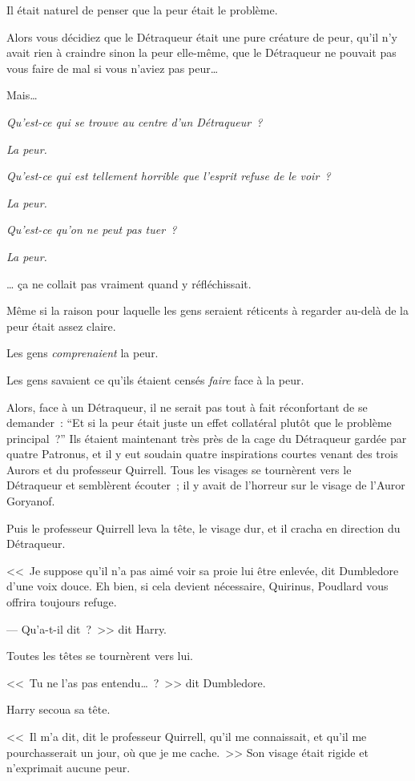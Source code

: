 Il était naturel de penser que la peur était le problème.

Alors vous décidiez que le Détraqueur était une pure créature de peur, qu'il n'y avait rien à craindre sinon la peur elle-même, que le Détraqueur ne pouvait pas vous faire de mal si vous n'aviez pas peur…

Mais…

\emph{Qu'est-ce qui se trouve au centre d'un Détraqueur~?}

\emph{La peur.}

\emph{Qu'est-ce qui est tellement horrible que l'esprit refuse de le voir~?}

\emph{La peur.}

\emph{Qu'est-ce qu'on ne peut pas tuer~?}

\emph{La peur.}

… ça ne collait pas vraiment quand y réfléchissait.

Même si la raison pour laquelle les gens seraient réticents à regarder au-delà de la peur était assez claire.

Les gens \emph{comprenaient} la peur.

Les gens savaient ce qu'ils étaient censés \emph{faire} face à la peur.

Alors, face à un Détraqueur, il ne serait pas tout à fait réconfortant de se demander~: “Et si la peur était juste un effet collatéral plutôt que le problème principal~?”
Ils étaient maintenant très près de la cage du Détraqueur gardée par quatre Patronus, et il y eut soudain quatre inspirations courtes venant des trois Aurors et du professeur Quirrell. Tous les visages se tournèrent vers le Détraqueur et semblèrent écouter~; il y avait de l'horreur sur le visage de l'Auror Goryanof.

Puis le professeur Quirrell leva la tête, le visage dur, et il cracha en direction du Détraqueur.

<<~Je suppose qu'il n'a pas aimé voir sa proie lui être enlevée, dit Dumbledore d'une voix douce. Eh bien, si cela devient nécessaire, Quirinus, Poudlard vous offrira toujours refuge.

--- Qu'a-t-il dit~?~>> dit Harry.

Toutes les têtes se tournèrent vers lui.

<<~Tu ne l'as pas entendu…~?~>> dit Dumbledore.

Harry secoua sa tête.

<<~Il m'a dit, dit le professeur Quirrell, qu'il me connaissait, et qu'il me pourchasserait un jour, où que je me cache.~>> Son visage était rigide et n'exprimait aucune peur.

